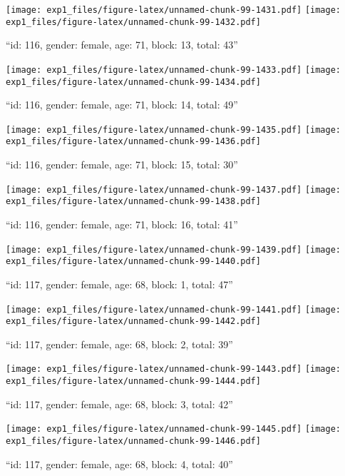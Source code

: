 \documentclass[,]{article}
\begin{document}
\texttt{[image: exp1\_files/figure-latex/unnamed-chunk-99-1431.pdf]}
\texttt{[image: exp1\_files/figure-latex/unnamed-chunk-99-1432.pdf]}

\newpage
[1] 

``id: 116, gender: female, age: 71, block: 13, total: 43''

\texttt{[image: exp1\_files/figure-latex/unnamed-chunk-99-1433.pdf]}
\texttt{[image: exp1\_files/figure-latex/unnamed-chunk-99-1434.pdf]}

\newpage
[1] 

``id: 116, gender: female, age: 71, block: 14, total: 49''

\texttt{[image: exp1\_files/figure-latex/unnamed-chunk-99-1435.pdf]}
\texttt{[image: exp1\_files/figure-latex/unnamed-chunk-99-1436.pdf]}

\newpage
[1] 

``id: 116, gender: female, age: 71, block: 15, total: 30''

\texttt{[image: exp1\_files/figure-latex/unnamed-chunk-99-1437.pdf]}
\texttt{[image: exp1\_files/figure-latex/unnamed-chunk-99-1438.pdf]}

\newpage
[1] 

``id: 116, gender: female, age: 71, block: 16, total: 41''

\texttt{[image: exp1\_files/figure-latex/unnamed-chunk-99-1439.pdf]}
\texttt{[image: exp1\_files/figure-latex/unnamed-chunk-99-1440.pdf]}

\newpage
[1] 

``id: 117, gender: female, age: 68, block: 1, total: 47''

\texttt{[image: exp1\_files/figure-latex/unnamed-chunk-99-1441.pdf]}
\texttt{[image: exp1\_files/figure-latex/unnamed-chunk-99-1442.pdf]}

\newpage
[1] 

``id: 117, gender: female, age: 68, block: 2, total: 39''

\texttt{[image: exp1\_files/figure-latex/unnamed-chunk-99-1443.pdf]}
\texttt{[image: exp1\_files/figure-latex/unnamed-chunk-99-1444.pdf]}

\newpage
[1] 

``id: 117, gender: female, age: 68, block: 3, total: 42''

\texttt{[image: exp1\_files/figure-latex/unnamed-chunk-99-1445.pdf]}
\texttt{[image: exp1\_files/figure-latex/unnamed-chunk-99-1446.pdf]}

\newpage
[1] 

``id: 117, gender: female, age: 68, block: 4, total: 40''
\end{document}
